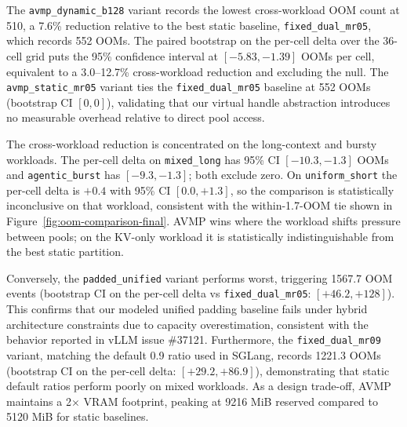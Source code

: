 The \texttt{avmp\_dynamic\_b128} variant records the lowest cross-workload OOM count at 510, a 7.6\% reduction relative to the best static baseline, \texttt{fixed\_dual\_mr05}, which records 552 OOMs. The paired bootstrap on the per-cell delta over the 36-cell grid puts the 95\% confidence interval at $[-5.83, -1.39]$ OOMs per cell, equivalent to a 3.0--12.7\% cross-workload reduction and excluding the null. The \texttt{avmp\_static\_mr05} variant ties the \texttt{fixed\_dual\_mr05} baseline at 552 OOMs (bootstrap CI $[0,0]$), validating that our virtual handle abstraction introduces no measurable overhead relative to direct pool access.

The cross-workload reduction is concentrated on the long-context and bursty workloads. The per-cell delta on \texttt{mixed\_long} has 95\% CI $[-10.3, -1.3]$ OOMs and \texttt{agentic\_burst} has $[-9.3, -1.3]$; both exclude zero. On \texttt{uniform\_short} the per-cell delta is $+0.4$ with 95\% CI $[0.0, +1.3]$, so the comparison is statistically inconclusive on that workload, consistent with the within-1.7-OOM tie shown in Figure~\ref{fig:oom-comparison-final}. AVMP wins where the workload shifts pressure between pools; on the KV-only workload it is statistically indistinguishable from the best static partition.

Conversely, the \texttt{padded\_unified} variant performs worst, triggering 1567.7 OOM events (bootstrap CI on the per-cell delta vs \texttt{fixed\_dual\_mr05}: $[+46.2, +128]$). This confirms that our modeled unified padding baseline fails under hybrid architecture constraints due to capacity overestimation, consistent with the behavior reported in vLLM issue \#37121. Furthermore, the \texttt{fixed\_dual\_mr09} variant, matching the default 0.9 ratio used in SGLang, records 1221.3 OOMs (bootstrap CI on the per-cell delta: $[+29.2, +86.9]$), demonstrating that static default ratios perform poorly on mixed workloads. As a design trade-off, AVMP maintains a 2$\times$ VRAM footprint, peaking at 9216 MiB reserved compared to 5120 MiB for static baselines.

\begin{table}[t]
\centering
\caption{Paired bootstrap 95\% CIs for the V1 headline claims (B=10000, RNG seed 20260520). Each row resamples matched (workload, model, pool, seed) tuples and reports either the per-tuple delta or the ratio of means. The V1 point estimates (13.30$\times$, 2.39$\times$, 1.83$\times$, $-7.6\%$) all sit inside their bootstrap CIs; the OOM delta on \texttt{uniform\_short} alone is inconclusive (CI $[0, +1.25]$ per cell). \textbf{Significant} = CI excludes the null (0 for deltas, 1 for ratios). Reproducible via \texttt{scripts/bootstrap\_ci.py}.}
\label{tab:bootstrap-ci}

\end{table}

